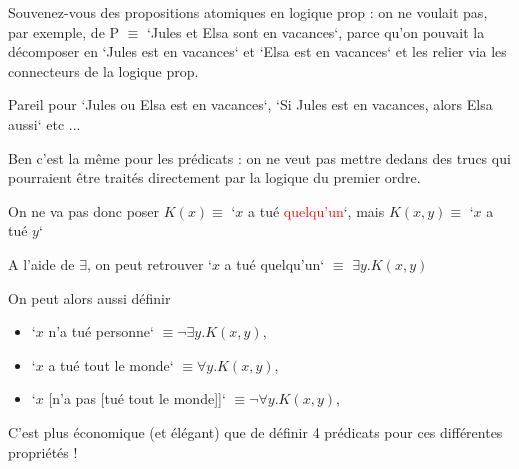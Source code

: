 \begin{frame}

	Souvenez-vous des propositions atomiques en logique prop : on ne voulait pas, par exemple, de P $\equiv$ `Jules et Elsa sont en vacances`, parce qu'on pouvait la décomposer en `Jules est en vacances` et `Elsa est en vacances` et les relier via les connecteurs de la logique prop.\newline\pause
	
	Pareil pour `Jules ou Elsa est en vacances`, `Si Jules est en vacances, alors Elsa aussi` etc ...\pause\newline
	
	Ben c'est la même pour les prédicats : on ne veut pas mettre dedans des trucs qui pourraient être traités directement par la logique du premier ordre.
	
	

\end{frame}



\begin{frame}
On ne va pas donc poser $K(x) \equiv$ `$x$ a tué \textcolor{red}{quelqu'un}`, mais $K(x,y) \equiv $ `$x$ a tué $y$`\pause\newline

A l'aide de $\exists$, on peut retrouver `$x$ a tué quelqu'un` $\equiv$ $\exists y. K(x,y)$\pause\newline

On peut alors aussi définir 
\begin{itemize}
\item[]`$x$ n'a tué personne` $\equiv \neg \exists y. K(x,y)$,  
\item[]`$x$ a tué tout le monde` $\equiv \forall y. K(x,y)$,  
\item[]`$x$ [n'a pas [tué tout le monde]]` $\equiv \neg \forall y. K(x,y)$,  
\end{itemize}
\pause
\vspace{0.3em}
C'est plus économique (et élégant) que de définir 4 prédicats pour ces différentes propriétés !

\end{frame}
	
	
	

